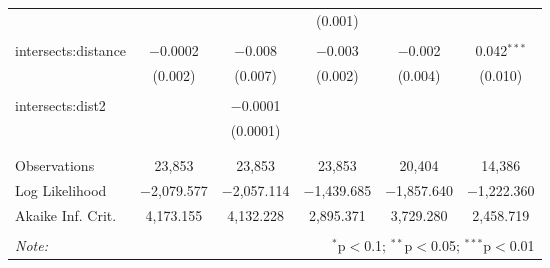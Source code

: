 \begin{table}[!htbp]
\begin{tabular}{@{\extracolsep{-5pt}}lccccc}
  &  &  & (0.001) &  &  \\ 
  & & & & & \\ 
 intersects:distance & $-$0.0002 & $-$0.008 & $-$0.003 & $-$0.002 & 0.042$^{***}$ \\ 
  & (0.002) & (0.007) & (0.002) & (0.004) & (0.010) \\ 
  & & & & & \\ 
 intersects:dist2 &  & $-$0.0001 &  &  &  \\ 
  &  & (0.0001) &  &  &  \\ 
  & & & & & \\ 
\hline \\[-1.8ex] 
Observations & 23,853 & 23,853 & 23,853 & 20,404 & 14,386 \\ 
Log Likelihood & $-$2,079.577 & $-$2,057.114 & $-$1,439.685 & $-$1,857.640 & $-$1,222.360 \\ 
Akaike Inf. Crit. & 4,173.155 & 4,132.228 & 2,895.371 & 3,729.280 & 2,458.719 \\ 
\hline 
\hline \\[-1.8ex] 
\textit{Note:}  & \multicolumn{5}{r}{$^{*}$p$<$0.1; $^{**}$p$<$0.05; $^{***}$p$<$0.01} \\ 
\end{tabular} 
\end{table} 
